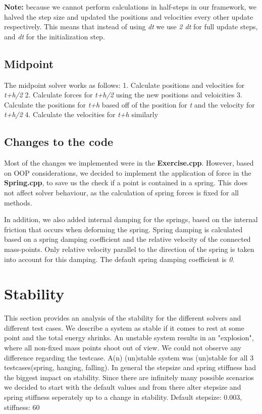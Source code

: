 \documentclass[11pt]{article}
\begin{document}
\textbf{Note:} because we cannot perform calculations in half-steps in
our framework, we halved the step size and updated the positions and
velocities every other update respectively. This means that instead of
using \emph{dt} we use \emph{2 dt} for full update steps, and \emph{dt}
for the initialization step.

\subsection{Midpoint}\label{midpoint}

The midpoint solver works as follows: 1. Calculate positions and
velocities for \emph{t+h/2} 2. Calculate forces for \emph{t+h/2} using
the new positions and veloicities 3. Calculate the positions for
\emph{t+h} based off of the position for \emph{t} and the velocity for
\emph{t+h/2} 4. Calculate the velocities for \emph{t+h} similarly

\subsection{Changes to the code}\label{changes-to-the-code}

Most of the changes we implemented were in the \textbf{Exercise.cpp}.
However, based on OOP considerations, we decided to implement the
application of force in the \textbf{Spring.cpp}, to save us the check if
a point is contained in a spring. This does not affect solver behaviour,
as the calculation of spring forces is fixed for all methods.

In addition, we also added internal damping for the springs, based on
the internal friction that occurs when deforming the spring. Spring
damping is calculated based on a spring damping coefficient and the
relative velocity of the connected mass-points. Only relative velocity
parallel to the direction of the spring is taken into account for this
damping. The default spring damping coefficient is \emph{0}.

\section{Stability}\label{stability}

This section provides an analysis of the stability for the different
solvers and different test cases. We describe a system as stable if it
comes to rest at some point and the total energy shrinks. An unstable
system results in an "explosion", where all non-fixed mass points shoot
out of view. We could not observe any difference regarding the testcase.
A(n) (un)stable system was (un)stable for all 3 testcases(spring,
hanging, falling). In general the stepsize and spring stiffness had the
biggest impact on stability. Since there are infinitely many possible
scenarios we decided to start with the default values and from there
alter stepsize and spring stiffness seperately up to a change in
stability. Default stepsize: 0.003, stiffness: 60
\end{document}
